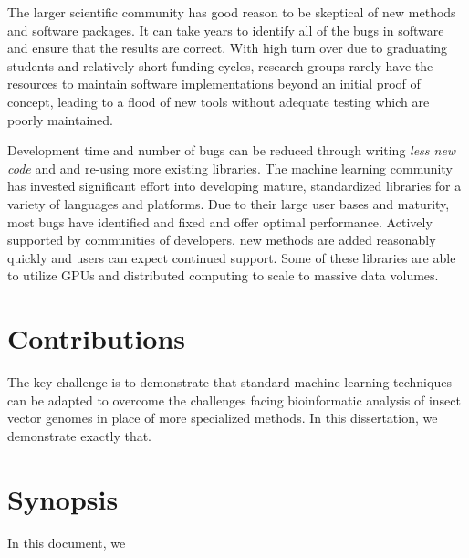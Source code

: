 The larger scientific community has good reason to be skeptical of new methods and software packages. It can take years to identify all of the bugs in software and ensure that the results are correct.  With high turn over due to graduating students and relatively short funding cycles, research groups rarely have the resources to maintain software implementations beyond an initial proof of concept, leading to a flood of new tools without adequate testing which are poorly maintained.

Development time and number of bugs can be reduced through writing \emph{less new code} and and re-using more existing libraries. The machine learning community has invested significant effort into developing mature, standardized libraries for a variety of languages and platforms.  Due to their large user bases and maturity, most bugs have identified and fixed and offer optimal performance.  Actively supported by communities of developers, new methods are added reasonably quickly and users can expect continued support.  Some of these libraries are able to utilize GPUs and distributed computing to scale to massive data volumes.

\section{Contributions}
The key challenge is to demonstrate that standard machine learning techniques can be adapted to overcome the challenges facing bioinformatic analysis of insect vector genomes in place of more specialized methods.  In this dissertation, we demonstrate exactly that.


\section{Synopsis}
In this document, we

